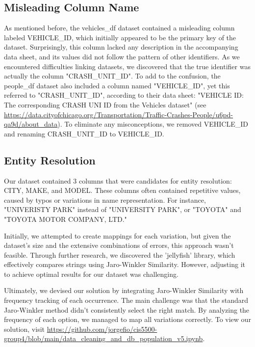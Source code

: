 \documentclass[12pt]{article}
\begin{document}
\subsection{Misleading Column Name}

As mentioned before, the vehicles\_df dataset contained a misleading column labeled VEHICLE\_ID, which initially appeared to be the primary key of the dataset. Surprisingly, this column lacked any description in the accompanying data sheet, and its values did not follow the pattern of other identifiers. As we encountered difficulties linking datasets, we discovered that the true identifier was actually the column "CRASH\_UNIT\_ID". To add to the confusion, the people\_df dataset also included a column named "VEHICLE\_ID", yet this referred to "CRASH\_UNIT\_ID", according to their data sheet: "VEHICLE ID: The corresponding CRASH UNI ID from the Vehicles dataset" (see \url{https://data.cityofchicago.org/Transportation/Traffic-Crashes-People/u6pd-qa9d/about_data}). To eliminate any misconceptions, we removed VEHICLE\_ID and renaming CRASH\_UNIT\_ID to VEHICLE\_ID.

\subsection{Entity Resolution}

Our dataset contained 3 columns that were candidates for entity resolution: CITY, MAKE,
and MODEL. These columns often contained repetitive values, caused by typos or variations in name representation. For instance, "UNIVERISTY PARK" instead of "UNIVERSITY PARK", or "TOYOTA" and "TOYOTA MOTOR COMPANY, LTD."

Initially, we attempted to create mappings for each variation, but given the dataset's size and the extensive combinations of errors, this approach wasn't feasible. Through further research, we discovered the 'jellyfish' library, which effectively compares strings using Jaro-Winkler Similarity. However, adjusting it to achieve optimal results for our dataset was challenging. 

Ultimately, we devised our solution by integrating Jaro-Winkler Similarity with frequency tracking of each occurrence. The main challenge was that the standard Jaro-Winkler method didn't consistently select the right match. By analyzing the frequency of each option, we managed to map all variations correctly. To view our solution, visit \url{https://github.com/jorgefio/cis5500-group4/blob/main/data_cleaning_and_db_population_v5.ipynb}.
\end{document}
